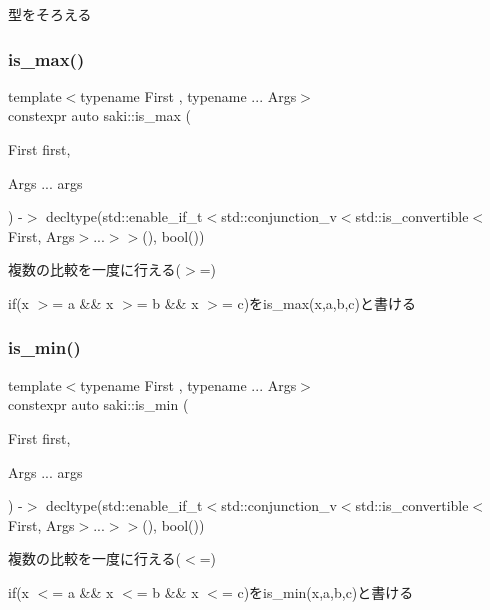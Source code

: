 型をそろえる 

\mbox{\label{namespacesaki_ae6b9ce1ba404eba8dd9035f99e8666c4}} 
\subsubsection{\texorpdfstring{is\+\_\+max()}{is\_max()}}
{\footnotesize\ttfamily template$<$typename First , typename ... Args$>$ \\
constexpr auto saki\+::is\+\_\+max (\begin{DoxyParamCaption}\item[{First}]{first,  }\item[{Args ...}]{args }\end{DoxyParamCaption}) -\/$>$ decltype(std\+::enable\+\_\+if\+\_\+t$<$std\+::conjunction\+\_\+v$<$std\+::is\+\_\+convertible$<$First, Args$>$...$>$$>$(), bool())
	}



複数の比較を一度に行える($>$=) 

if(x $>$= a \&\& x $>$= b \&\& x $>$= c)をis\+\_\+max(x,a,b,c)と書ける \mbox{\label{namespacesaki_a76f6dc2cbe6bb83e0235b9635eb33ad2}} 
\subsubsection{\texorpdfstring{is\+\_\+min()}{is\_min()}}
{\footnotesize\ttfamily template$<$typename First , typename ... Args$>$ \\
constexpr auto saki\+::is\+\_\+min (\begin{DoxyParamCaption}\item[{First}]{first,  }\item[{Args ...}]{args }\end{DoxyParamCaption}) -\/$>$ decltype(std\+::enable\+\_\+if\+\_\+t$<$std\+::conjunction\+\_\+v$<$std\+::is\+\_\+convertible$<$First, Args$>$...$>$$>$(), bool())
	}



複数の比較を一度に行える($<$=) 

if(x $<$= a \&\& x $<$= b \&\& x $<$= c)をis\+\_\+min(x,a,b,c)と書ける \mbox{\label{namespacesaki_a03cf21b9e2231e956f8da966f1e09d70}} 
